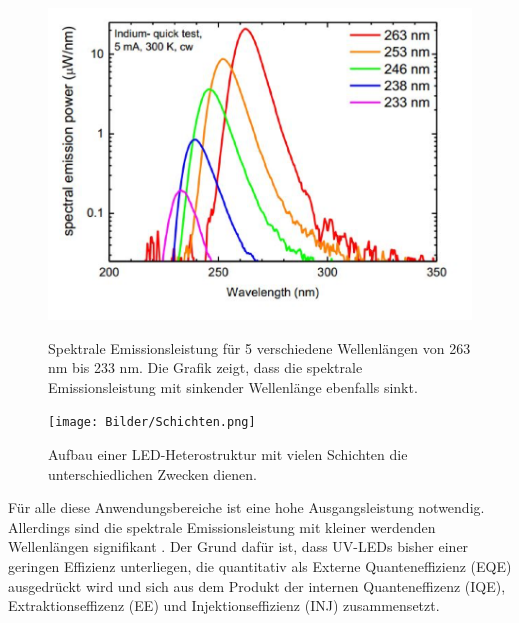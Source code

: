 \begin{figure}[htb]
    \centering
    \begin{minipage}[t]{0.49\linewidth}
        \centering
        \includegraphics[width=\linewidth]{Bilder/SpectralEmissionPower_Wavelength.png}
        \caption{Spektrale Emissionsleistung für 5 verschiedene Wellenlängen von 263 nm bis 233 nm. Die Grafik zeigt, dass die spektrale Emissionsleistung mit sinkender Wellenlänge ebenfalls sinkt\cite{semreich}.}
        \label{fig:specPowWVL}
    \end{minipage}
    \hfill
    \begin{minipage}[t]{0.49\linewidth}
        \centering
        \texttt{[image: Bilder/Schichten.png]}
        \caption{Aufbau einer LED-Heterostruktur mit vielen Schichten die unterschiedlichen Zwecken dienen.}
        \label{fig:schichtenLED}
    \end{minipage}
\end{figure}
\noindent
%
\fi
\newline
Für alle diese Anwendungsbereiche ist eine hohe Ausgangsleistung notwendig. Allerdings sind die spektrale Emissionsleistung mit kleiner werdenden Wellenlängen signifikant \cite{0268-1242-26-1-014036}. Der Grund dafür ist, dass UV-LEDs bisher einer geringen Effizienz unterliegen, die quantitativ als Externe Quanteneffizienz (EQE) ausgedrückt wird und sich aus dem Produkt der internen Quanteneffizenz (IQE), Extraktionseffizenz (EE) und Injektionseffizienz (INJ) zusammensetzt.

\newline
